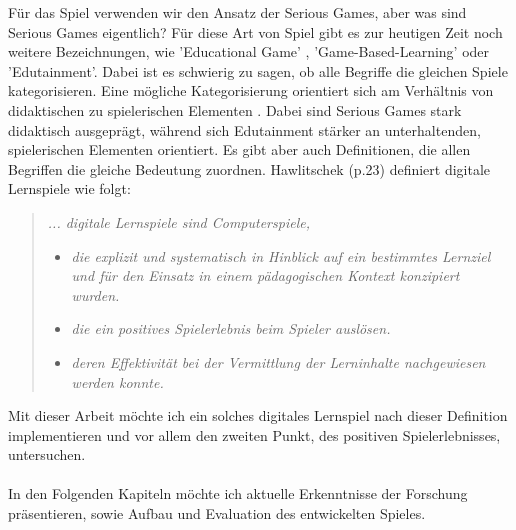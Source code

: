 Für das Spiel verwenden wir den Ansatz der Serious Games, aber was sind Serious Games eigentlich? Für diese Art von Spiel gibt es zur heutigen Zeit noch weitere Bezeichnungen, wie 'Educational Game' , 'Game-Based-Learning' oder 'Edutainment'. Dabei ist es schwierig zu sagen, ob alle Begriffe die gleichen Spiele kategorisieren. Eine mögliche Kategorisierung orientiert sich am Verhältnis von didaktischen zu spielerischen Elementen \cite{Wechselberger2009}. Dabei sind Serious Games stark didaktisch ausgeprägt, während sich Edutainment stärker an unterhaltenden, spielerischen Elementen orientiert. Es gibt aber auch Definitionen, die allen Begriffen die gleiche Bedeutung zuordnen. Hawlitschek\cite{hawlitschek2013} (p.23) definiert digitale Lernspiele wie folgt:
\begin{quote}
\textit{... digitale Lernspiele sind Computerspiele,}
\begin{itemize}
\item \textit{die explizit und systematisch in Hinblick auf ein bestimmtes Lernziel und für den Einsatz in einem pädagogischen Kontext konzipiert wurden.}
\item \textit{die ein positives Spielerlebnis beim Spieler auslösen.}
\item \textit{deren Effektivität bei der Vermittlung der Lerninhalte nachgewiesen werden konnte.}
\end{itemize}
\end{quote}
Mit dieser Arbeit möchte ich ein solches digitales Lernspiel nach dieser Definition implementieren und vor allem den zweiten Punkt, des positiven Spielerlebnisses, untersuchen.\\
\\
In den Folgenden Kapiteln möchte ich aktuelle Erkenntnisse der Forschung präsentieren, sowie Aufbau und Evaluation des entwickelten Spieles.